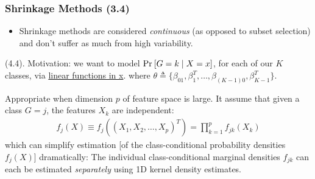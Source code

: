 \documentclass[11pt]{article}
\begin{document}
\subsubsection{Shrinkage Methods (3.4)}
\begin{itemize}
	\item Shrinkage methods are considered \textit{continuous} (as opposed to subset selection) and don't suffer as much from high variability. 
\end{itemize}





\p {} (4.4). Motivation: we want to model $\text{Pr}_{}\left[G = k \mid X = x\right]$, for each of our $K$ classes, via \underline{linear functions in x}. 
where $\theta \triangleq \{\beta_{01}, \beta_1^T, \ldots, \beta_{(K-1)0}, \beta_{K-1}^T \}$. 




\p Appropriate when dimension $p$ of feature space is large. It assume that given a class $G = j$, the features $X_k$ are independent:
\begin{align}
f_j(X) \equiv f_j((X_1, X_2, \ldots, X_p)^T) = \prod_{k = 1}^{p} f_{jk}(X_k)
\end{align}
which can simplify estimation [of the class-conditional probability densities $f_j(X)$] dramatically: The individual class-conditional marginal densities $f_{jk}$ can each be estimated \textit{separately} using 1D kernel density estimates. 
\end{document}
